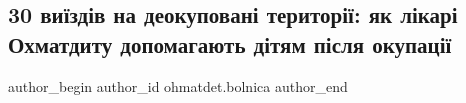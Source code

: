  
 
 
 
 
 
\subsection{30 виїздів на деокуповані території: як лікарі Охматдиту допомагають дітям після окупації}
\label{sec:13_12_2022.fb.ohmatdet.bolnica.1.vyizdy}
 
\ifcmt
 author_begin
   author_id ohmatdet.bolnica
 author_end
\fi
